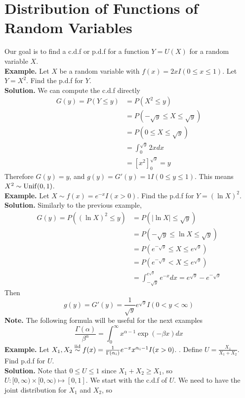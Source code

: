 \documentclass[openany]{report}
\begin{document}
    \section{Distribution of Functions of Random Variables}
    Our goal is to find a c.d.f or p.d.f for a function $Y = U(X)$ for a random variable $X$.\\[2ex]
    \textbf{Example.} Let $X$ be a random variable with $f(x) = 2xI(0 \leq x \leq 1)$. Let $Y = X^2$. Find the p.d.f for $Y$.\\[2ex]
    \textbf{Solution.} We can compute the c.d.f directly 
    \begin{align*}
        G(y) = P(Y \leq y) &= P(X^2 \leq y)\\
        &= P(-\sqrt{y} \leq X \leq \sqrt{y})\\
        &= P(0 \leq X \leq \sqrt{y})\tag{Since $x \in [0,1]$}\\
        &= \int_0^{\sqrt{y}}2xdx\\
        &= \left[x^2\right]^{\sqrt{y}}_0 = y
    \end{align*}
    Therefore $G(y) = y$, and $g(y) = G'(y) = 1 I(0 \leq y \leq 1)$. This means $X^2 \sim \operatorname{Unif}(0,1)$. \\[2ex]
    \textbf{Example.} Let $X \sim f(x) = e^{-x}I(x > 0)$. Find the p.d.f for $Y = (\ln X)^2$.\\[2ex]
    \textbf{Solution.} Similarly to the previous example,
    \begin{align*}
        G(y) = P((\ln X)^2 \leq y) &= P(|\ln X| \leq \sqrt{y})\\
        &= P(-\sqrt{y} \leq \ln X \leq \sqrt{y})\\
        &= P(e^{-\sqrt{y}} \leq X \leq e^{\sqrt{y}})\\
        &= P(e^{-\sqrt{y}} < X \leq e^{\sqrt{y}})\\
        &= \int_{-\sqrt{y}}^{e^{\sqrt{y}}}e^{-x}dx = e^{\sqrt{y}} - e^{-\sqrt{y}}
    \end{align*} 
    Then 
    \[g(y) = G'(y) = \frac{1}{\sqrt{y}}e^{\sqrt{y}}I(0 < y < \infty)\]
    \textbf{Note.} The following formula will be useful for the next examples 
    \[\frac{\Gamma(\alpha)}{\beta^\alpha} = \int_0^\infty x^{\alpha - 1}\exp(-\beta x)dx\]
    \textbf{Example.} Let $X_1, X_2 \overset{\mathrm{iid}}{\sim} f(x) = \frac{1}{\Gamma(\alpha_i)}e^{-x}x^{\alpha_i - 1}I(x > 0)$. . Define $U = \frac{X_1}{X_1 + X_2}$. Find p.d.f for $U$. \\[1ex]
    \textbf{Solution.} Note that $0 \leq U \leq 1$ since $X_1 + X_2 \geq X_1$, so $U: [0,\infty) \times [0,\infty) \mapsto [0,1]$. We start with the c.d.f of $U$. We need to have the joint distribution for $X_1$ and $X_2$, so 
\end{document}
